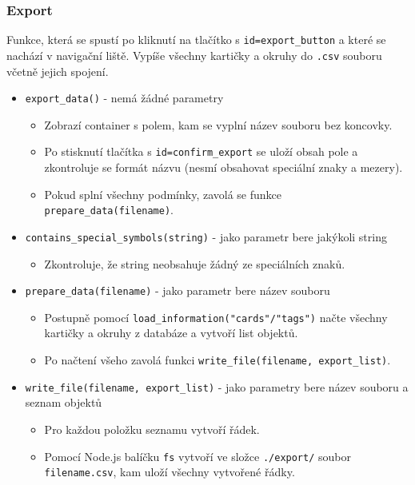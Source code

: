 \documentclass[11pt]{article}
\providecommand{\tightlist}{\setlength{\itemsep}{1pt}\setlength{\parskip}{1pt}}
\let\oldtexttt\texttt
\renewcommand{\texttt}[1]{\oldtexttt{\textcolor{codehighlight}{#1}}}
\begin{document}
\hypertarget{export}{%
\subsubsection{Export}\label{export}}

Funkce, která se spustí po kliknutí na tlačítko s
\texttt{id=export\_button} a které se nachází v navigační liště. Vypíše
všechny kartičky a okruhy do \texttt{.csv} souboru včetně jejich
spojení.

\begin{itemize}
\tightlist
\item
  \texttt{export\_data()} - nemá žádné parametry

  \begin{itemize}
  \tightlist
  \item
    Zobrazí container s polem, kam se vyplní název souboru bez koncovky.
  \item
    Po stisknutí tlačítka s \texttt{id=confirm\_export} se uloží obsah
    pole a zkontroluje se formát názvu (nesmí obsahovat speciální znaky
    a mezery).
  \item
    Pokud splní všechny podmínky, zavolá se funkce
    \texttt{prepare\_data(filename)}.
  \end{itemize}
\item
  \texttt{contains\_special\_symbols(string)} - jako parametr bere
  jakýkoli string

  \begin{itemize}
  \tightlist
  \item
    Zkontroluje, že string neobsahuje žádný ze speciálních znaků.
  \end{itemize}
\item
  \texttt{prepare\_data(filename)} - jako parametr bere název souboru

  \begin{itemize}
  \tightlist
  \item
    Postupně pomocí \texttt{load\_information("cards"/"tags")} načte
    všechny kartičky a okruhy z databáze a vytvoří list objektů.
  \item
    Po načtení všeho zavolá funkci
    \texttt{write\_file(filename,\ export\_list)}.
  \end{itemize}
\item
  \texttt{write\_file(filename,\ export\_list)} - jako parametry bere
  název souboru a seznam objektů

  \begin{itemize}
  \tightlist
  \item
    Pro každou položku seznamu vytvoří řádek.
  \item
    Pomocí Node.js balíčku \texttt{fs} vytvoří ve složce
    \texttt{./export/} soubor \texttt{filename.csv}, kam uloží všechny
    vytvořené řádky.
  \end{itemize}
\end{itemize}
\end{document}
